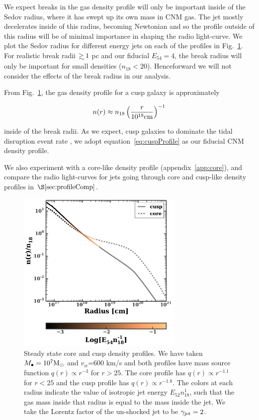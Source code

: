 \documentclass[usenatbib,fleqn]{mnras}
\newcommand\gsim{\mathrel{\rlap{\lower4pt\hbox{\hskip1pt$\sim$}}
    \raise1pt\hbox{$>$}}}
\newcommand{\Mbh}[1][]{M_{\bullet#1}}
\newcommand{\Msun}{{\rm M_\odot}}
\begin{document}
We expect breaks in the gas density profile will only be important
inside of the Sedov radius, where it has swept up its own mass in CNM
gas.  The jet mostly decelerates inside of this radius, becoming
Newtonian and so the profile outside of this radius will be of minimal
importance in shaping the radio light-curve. We plot the Sedov
radius for different energy jets on each of the profiles in
Fig.~\ref{fig:profiles}. For realistic break radii $\gsim 1$ pc and
our fiducial $E_{54}=4$, the break radius will only be important for
small densities ($n_{18}<20$). Henceforward we will not consider the
effects of the break radius in our analysis.

From Fig.~\ref{fig:profiles}, the gas density profile for a cusp
galaxy is approximately

\begin{equation}
n(r) \approx n_{18} \left(\frac{r}{10^{18} {\rm cm}}\right)^{-1}
\label{eq:cuspProfile}
\end{equation}

inside of the break radii. As we expect, cusp galaxies to dominate the
tidal disruption event rate \citep{Stone&Metzger2015}, we adopt
equation~\eqref{eq:cuspProfile} as our fiducial CNM density profile.

We also experiment with a core-like density profile
(appendix~\ref{app:core}), and compare the radio light-curves for jets
going through core and cusp-like density profiles in
$\S\ref{sec:profileComp}$.


\begin{figure}
\includegraphics[width=8cm]{sedov_radius.pdf}
\caption{\label{fig:profiles} Steady state core and cusp density
  profiles. We have taken $\Mbh=10^{7} \Msun$ and $v_w$=600 km/s and
  both profiles have mass source function $q(r) \propto
  r^{-3}$ for $r > 25$. The core profile has $q(r) \propto
  r^{-1.1}$ for $r < 25$ and the cusp profile has $q(r)
  \propto r^{-1.8}$.  The colors at each radius indicate the value of
  isotropic jet energy $E_{52} n_{18}^{1}$, such that the gas mass
  inside that radius is equal to the mass inside the jet. We take the
  Lorentz factor of the un-shocked jet to be $\gamma_{\rm jet}=2$.}
\end{figure}
\end{document}

